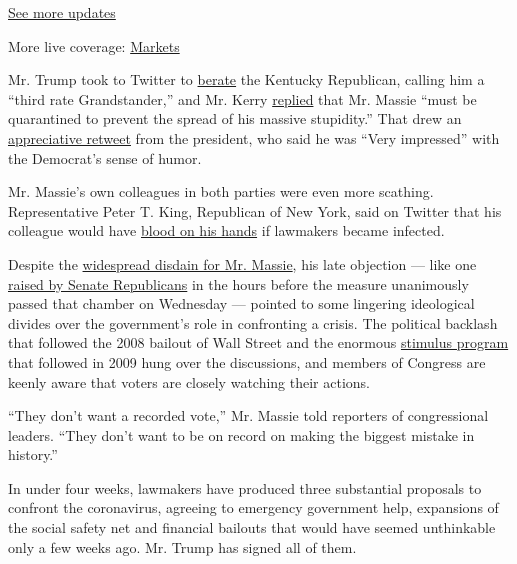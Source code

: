 \href{https://www.nytimes.com/2020/08/01/world/coronavirus-covid-19.html?action=click\&pgtype=Article\&state=default\&region=MAIN_CONTENT_1\&context=storylines_live_updates}{See
more updates}

More live coverage:
\href{https://www.nytimes.com/live/2020/07/31/business/stock-market-today-coronavirus?action=click\&pgtype=Article\&state=default\&region=MAIN_CONTENT_1\&context=storylines_live_updates}{Markets}

Mr. Trump took to Twitter to
\href{https://twitter.com/realDonaldTrump/status/1243534441772974081?s=20}{berate}
the Kentucky Republican, calling him a ``third rate Grandstander,'' and
Mr. Kerry
\href{https://twitter.com/JohnKerry/status/1243552337429438464?s=20}{replied}
that Mr. Massie ``must be quarantined to prevent the spread of his
massive stupidity.'' That drew an
\href{https://twitter.com/realDonaldTrump/status/1243572588200280064?s=20}{appreciative
retweet} from the president, who said he was ``Very impressed'' with the
Democrat's sense of humor.

Mr. Massie's own colleagues in both parties were even more scathing.
Representative Peter T. King, Republican of New York, said on Twitter
that his colleague would have
\href{https://twitter.com/RepPeteKing/status/1243595215828549635?s=20}{blood
on his hands} if lawmakers became infected.

Despite the
\href{https://www.nytimes.com/2020/03/27/us/politics/thomas-massie-coronavirus.html}{widespread
disdain for Mr. Massie}, his late objection --- like one
\href{https://www.nytimes.com/2020/03/25/us/politics/coronavirus-senate-deal.html}{raised
by Senate Republicans} in the hours before the measure unanimously
passed that chamber on Wednesday --- pointed to some lingering
ideological divides over the government's role in confronting a crisis.
The political backlash that followed the 2008 bailout of Wall Street and
the enormous
\href{https://www.nytimes.com/article/where-is-my-stimulus-payment.html}{stimulus
program} that followed in 2009 hung over the discussions, and members of
Congress are keenly aware that voters are closely watching their
actions.

``They don't want a recorded vote,'' Mr. Massie told reporters of
congressional leaders. ``They don't want to be on record on making the
biggest mistake in history.''

In under four weeks, lawmakers have produced three substantial proposals
to confront the coronavirus, agreeing to emergency government help,
expansions of the social safety net and financial bailouts that would
have seemed unthinkable only a few weeks ago. Mr. Trump has signed all
of them.

